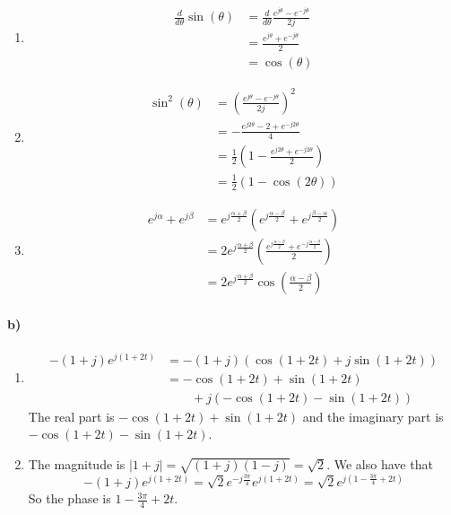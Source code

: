 \documentclass[12pt]{article}
\begin{document}
\begin{enumerate}
    \item
    \begin{align*}
        \frac{d}{d\theta} \sin(\theta) &= \frac{d}{d\theta} \frac{e^{j\theta}-e^{-j\theta}}{2j} \\
        &=\frac{e^{j\theta}+e^{-j\theta}}{2}\\
        &=\cos(\theta)
    \end{align*}
    \item
    \begin{align*}
        \sin^2(\theta) &=\left(\frac{e^{j\theta}-e^{-j\theta}}{2j}\right)^2 \\
        &=-\frac{e^{j2\theta}-2+e^{-j2\theta}}{4}\\
        &=\frac{1}{2}\left(1-\frac{e^{j2\theta}+e^{-j2\theta}}{2}\right)\\
        &=\frac{1}{2}(1-\cos(2\theta))
    \end{align*}
    \item
    \begin{align*}
        e^{j\alpha}+e^{j\beta} &=e^{j\frac{\alpha+\beta}{2}}\left(e^{j\frac{\alpha-\beta}{2}}+e^{j\frac{\beta-\alpha}{2}}\right) \\
        &=2e^{j\frac{\alpha+\beta}{2}}\left(\frac{e^{j\frac{\alpha-\beta}{2}}+e^{-j\frac{\alpha-\beta}{2}}}{2}\right)\\
        &=2e^{j\frac{\alpha+\beta}{2}}\cos\left(\frac{\alpha-\beta}{2}\right)
    \end{align*}
\end{enumerate}

\paragraph{b)}

\begin{enumerate}
    \item
    \begin{align*}
        -(1+j)e^{j(1+2t)}&=-(1+j)(\cos(1+2t)+j\sin(1+2t))\\
        &=-\cos(1+2t)+\sin(1+2t)\\
        &\qquad+j(-\cos(1+2t)-\sin(1+2t))
    \end{align*}
    The real part is \(-\cos(1+2t)+\sin(1+2t)\) and the imaginary part is \(-\cos(1+2t)-\sin(1+2t)\).
    \item The magnitude is \(|1+j|=\sqrt{(1+j)(1-j)}=\sqrt{2}\). We also have that
    \[-(1+j)e^{j(1+2t)}=\sqrt{2}e^{-j\frac{3\pi}{4}}e^{j(1+2t)}=\sqrt{2}e^{j\left(1-\frac{3\pi}{4}+2t\right)}\]
    So the phase is \(1-\frac{3\pi}{4}+2t\).
\end{enumerate}
\end{document}

